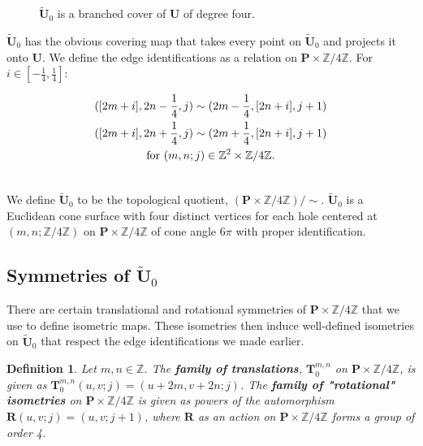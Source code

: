 \documentclass[]{article}
\newtheorem{Def}{Definition}[subsection]
\begin{document}
\begin{figure}[H]
\centering

\label{fig:utilda0}
\caption{$\tilde{\mathbf{U}}_0$ is a branched cover of $\mathbf{U}$ of degree four.}
\end{figure}

$\tilde{\mathbf{U}}_0$ has the obvious covering map that takes every point on $\tilde{\mathbf{U}}_0$ and projects it onto $\mathbf{U}$. We define the edge identifications as a relation on $\mathbf{P}\times\mathbb{Z}/4\mathbb{Z}$. For $i\in[-\frac{1}{4},\frac{1}{4}]$:


\begin{multline}
([2m+i], 2n-\frac{1}{4},j)\sim(2m-\frac{1}{4},[2n+i],j+1)\\
([2m+i], 2n+\frac{1}{4},j)\sim(2m+\frac{1}{4},[2n+i],j+1)\\
\vspace{0.2in}\text{for } (m,n;j) \in \mathbb{Z}^{2}\times\mathbb{Z}/4\mathbb{Z}.
\label{eq:rel2}
\end{multline}

We define $\tilde{\mathbf{U}}_0$ to be the topological quotient, $(\mathbf{P}\times\mathbb{Z}/4\mathbb{Z})/\sim$. $\tilde{\mathbf{U}}_0$ is a Euclidean cone surface with four distinct vertices for each hole centered at $(m,n;\mathbb{Z}/4\mathbb{Z})$ on $\mathbf{P}\times\mathbb{Z}/4\mathbb{Z}$ of cone angle $6\pi$ with proper identification.

\subsection{Symmetries of $\tilde{\mathbf{U}}_0$}
There are certain translational and rotational symmetries of $\mathbf{P}\times\mathbb{Z}/4\mathbb{Z}$ that we use to define isometric maps. These isometries then induce well-defined isometries on $\tilde{\mathbf{U}}_0$ that respect the edge identifications we made earlier.

\begin{Def}Let $m,n\in\mathbb{Z}$. The \textbf{family of translations}, $\mathbf{T}^{m,n}_{0}$ on $\mathbf{P}\times\mathbb{Z}/4\mathbb{Z}$, is given as $\mathbf{T}^{m,n}_{0}(u,v;j)=(u+2m,v+2n;j)$.\newline
The \textbf{family of "rotational" isometries} on $\mathbf{P}\times\mathbb{Z}/4\mathbb{Z}$ is given as powers of the automorphism $\mathbf{R}(u,v;j)=(u,v;j+1)$, where $\mathbf{R}$ as an action on $\mathbf{P}\times\mathbb{Z}/4\mathbb{Z}$ forms a group of order 4.
\end{Def}
\end{document}
